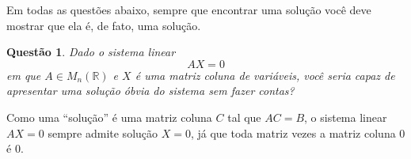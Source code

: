 \documentclass[a4paper,12pt]{article}
\author{Solução do ``1º Testinho'' - GAAL}
\date{28 de Março de 2019}
\title{}
\def\R{\mathbb R}
\newenvironment{sol}{\begin{tcolorbox}[breakable,colback=blue!5!white,colframe=blue!40!white,title=\normalsize {\sc{Solução}},coltitle=black]}{\end{tcolorbox}}
\newtheorem{qst}{Questão}
\begin{document}
\maketitle

Em todas as questões abaixo, sempre que encontrar uma solução você deve mostrar que ela é, de fato, uma solução.

\begin{qst}
Dado o sistema linear
\[AX=0\] em que $A\in M_n(\R)$ e $X$ é uma matriz coluna de variáveis, você seria capaz de apresentar uma solução óbvia do sistema sem fazer contas?
\end{qst}
\begin{sol}
	Como uma ``solução'' é uma matriz coluna $C$ tal que $AC=B$, o sistema linear $AX=0$ sempre admite solução $X=0$, já que toda matriz vezes a matriz coluna $0$ é $0$.
\end{sol}
\end{document}
